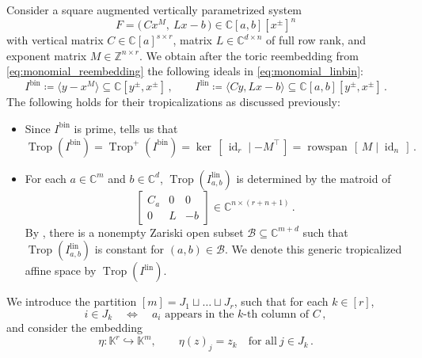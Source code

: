\documentclass[11pt,reqno,a4paper]{amsart}
\numberwithin{equation}{section}
\theoremstyle{theoremstyle}
\theoremstyle{examplestyle}
\newcommand{\CC}{\mathbb{C}}
\newcommand{\lin}{{\mathrm{lin}}}
\newcommand{\bin}{{\mathrm{bin}}}
\DeclareMathOperator{\rowspan}{rowspan}
\DeclareMathOperator{\id}{id}
\DeclareMathOperator{\Trop}{Trop}
\begin{document}
Consider a square augmented vertically parametrized system 
\[ F=\big(\,C  x^M ,\: Lx-b\,\big)\in \CC[a,b][x^\pm]^n\]
with  vertical matrix $C\in \CC[a]^{s\times r}$, matrix $L\in\CC^{d\times n}$ of full row rank, and exponent matrix $M\in \mathbb{Z}^{n\times r}$. 
We obtain after the toric reembedding from \eqref{eq:monomial_reembedding} 
the following ideals in \eqref{eq:monomial_linbin}:
\begin{equation*} 
I^{\bin}\coloneqq \langle y - x^{M}  \rangle \subseteq \CC[y^\pm,x^\pm]\,, \qquad  I^{\lin} \coloneqq \langle C y  , Lx - b  \rangle \subseteq \CC[a,b][y^\pm,x^\pm]\, . 
\end{equation*}
The following holds for their tropicalizations as discussed previously:
\begin{itemize}
    \item Since $I^{\bin}$ is prime,  tells us that 
    \[ \Trop(I^{\bin})=\Trop^+(I^{\bin})=\ker\,  [\,\id_{r} \mid -M^\top\,] = \rowspan\,[\,M\mid \id_n\,] \, . \] 
    \item For each $a\in \CC^m$ and $b\in\CC^d$,  $\Trop(I^{\lin}_{a,b})$ is determined by the matroid of
    \begin{equation}
    \label{eq:block_matrix_for_linear_part}
    \begin{bmatrix}C_a & 0 & 0 \\ 0 & L &-b\end{bmatrix}\in\CC^{n\times (r+n+1)}\, . 
    \end{equation}
           By , there is a nonempty Zariski open subset $\mathcal{B} \subseteq \CC^{m+d}$ such that $\Trop(I_{a,b}^{\lin})$ is constant for $(a,b)\in\mathcal{B}$.
           We denote this generic tropicalized affine space by $\Trop(I^{\lin})$. 
\end{itemize}

\smallskip
We introduce the partition 
$[m] = J_1 \sqcup \dots \sqcup J_r$, such that for each $k\in [r]$,  
\begin{equation*}\label{eq:partition}
i\in J_k \quad \Leftrightarrow\quad \text{$a_i$ appears in the $k$-th column of $C$}\, ,
\end{equation*}
and consider the embedding
\begin{equation*}\label{eq:nu}
\eta \colon \mathbb{K}^r \hookrightarrow \mathbb{K}^m, \qquad \eta(z)_j= z_k \quad \text{for all} \ j \in J_k \,.
\end{equation*}

 
\end{document}
